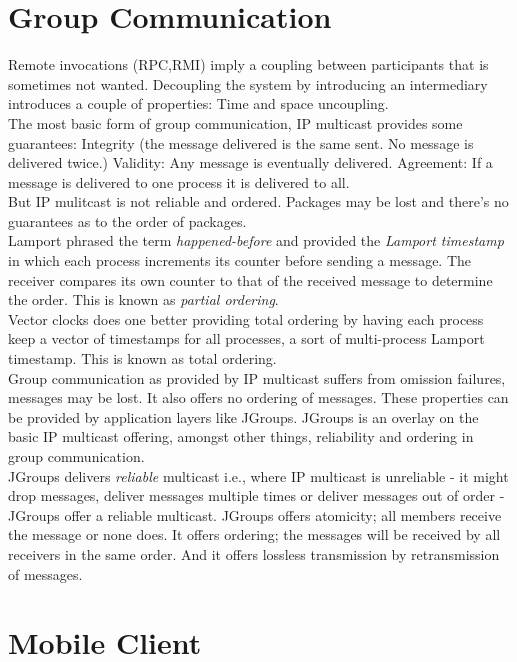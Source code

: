 \section{Group Communication}
Remote invocations (RPC,RMI) imply a coupling between participants that is sometimes not wanted. Decoupling the system by introducing an intermediary introduces a couple of properties: Time and space uncoupling.\\

The most basic form of group communication, IP multicast provides some guarantees: Integrity (the message delivered is the same sent. No message is delivered twice.) Validity: Any message is eventually delivered. Agreement: If a message is delivered to one process it is delivered to all.\\

But IP mulitcast is not reliable and ordered. Packages may be lost and there's no guarantees as to the order of packages.\\

Lamport phrased the term \emph{happened-before} and provided the \emph{Lamport timestamp} in which each process increments its counter before sending a message. The receiver compares its own counter to that of the received message to determine the order. This is known as \emph{partial ordering}.\\

Vector clocks does one better providing total ordering by having each process keep a vector of timestamps for all processes, a sort of multi-process Lamport timestamp. This is known as total ordering. \\

Group communication as provided by IP multicast suffers from omission failures, messages may be lost. It also offers no ordering of messages. These properties can be provided by application layers like JGroups. JGroups is an overlay on the basic IP multicast offering, amongst other things, reliability and ordering in group communication. \\

JGroups delivers \emph{reliable} multicast i.e., where IP multicast is unreliable - it might drop messages, deliver messages multiple times or deliver messages out of order - JGroups offer a reliable multicast. JGroups offers atomicity; all members receive the message or none does. It offers ordering; the messages will be received by all receivers in the same order. And it offers lossless transmission by retransmission of messages.\\




\section{Mobile Client}